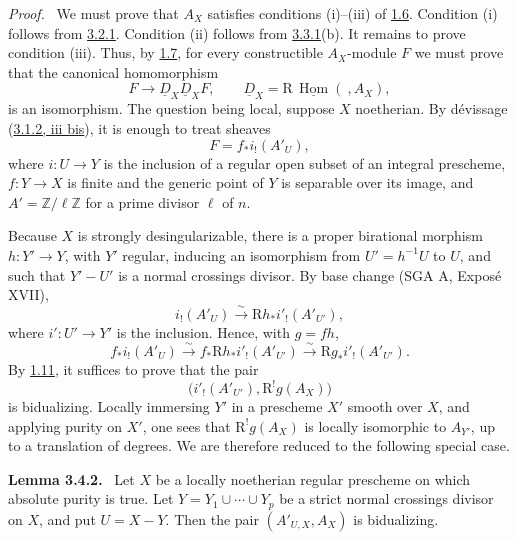 \documentclass[11pt]{article}
\providecommand{\ZZ}{\mathbb{Z}}
\newenvironment{statement}[1]{\par\medskip\noindent\textbf{#1.}\ }{\par\medskip}
\newenvironment{prooftext}[1][Proof]{\par\noindent\emph{#1.}\ }{\par\medskip}
\DeclareMathOperator{\Hom}{Hom}
\newcommand{\R}{\mathrm{R}}
\providecommand{\Hom}{\operatorname{Hom}}
\providecommand{\R}{\mathrm R}
\providecommand{\Hom}{\operatorname{Hom}}
\begin{document}
\begin{prooftext}
We must prove that $A_X$ satisfies conditions (i)--(iii) of \hyperref[sga5:I:proposition:1.6]{1.6}. Condition (i) follows from \hyperref[sga5:I:proposition:3.2.1]{3.2.1}. Condition (ii) follows from \hyperref[sga5:I:proposition:3.3.1]{3.3.1}(b). It remains to prove condition (iii). Thus, by \hyperref[sga5:I:definition:1.7]{1.7}, for every constructible $A_X$-module $F$ we must prove that the canonical homomorphism
\[
   F\longrightarrow \underline D_X\underline D_XF,
   \qquad \underline D_X=\R\,\underline{\Hom}(\ ,A_X),
\]
is an isomorphism. The question being local, suppose $X$ noetherian. By dévissage (\hyperref[sga5:I:statement:3.1.2]{3.1.2, iii bis}), it is enough to treat sheaves
\[
   F=f_*i_!(A'_U),
\]
where $i:U\to Y$ is the inclusion of a regular open subset of an integral prescheme, $f:Y\to X$ is finite and the generic point of $Y$ is separable over its image, and $A'=\ZZ/\ell\ZZ$ for a prime divisor $\ell$ of $n$.

Because $X$ is strongly desingularizable, there is a proper birational morphism $h:Y'\to Y$, with $Y'$ regular, inducing an isomorphism from $U'=h^{-1}U$ to $U$, and such that $Y'-U'$ is a normal crossings divisor. By base change (SGA A, Exposé XVII),
\[
   i_!(A'_U)\xrightarrow{\sim}\R h_*i'_!(A'_{U'}),
\]
where $i':U'\to Y'$ is the inclusion. Hence, with $g=fh$,
\[
   f_*i_!(A'_U)
     \xrightarrow{\sim} f_*\R h_*i'_!(A'_{U'})
     \xrightarrow{\sim} \R g_*i'_!(A'_{U'}).
\]
By \hyperref[sga5:I:proposition:1.11]{1.11}, it suffices to prove that the pair
\[
   \bigl(i'_!(A'_{U'}),\R^!g(A_X)\bigr)
\]
is bidualizing. Locally immersing $Y'$ in a prescheme $X'$ smooth over $X$, and applying purity on $X'$, one sees that $\R^!g(A_X)$ is locally isomorphic to $A_{Y'}$, up to a translation of degrees. We are therefore reduced to the following special case.
\end{prooftext}

\label{sga5:I:lemma:3.4.2}\begin{statement}{Lemma 3.4.2}
Let $X$ be a locally noetherian regular prescheme on which absolute purity is true. Let $Y=Y_1\cup\cdots\cup Y_p$ be a strict normal crossings divisor on $X$, and put $U=X-Y$. Then the pair $(A'_{U,X},A_X)$ is bidualizing.
\end{statement}
\end{document}

